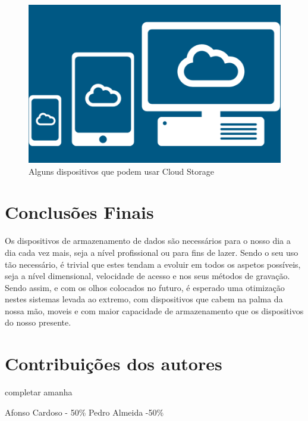 \documentclass{report}
\begin{document}
\vspace{15mm}
 
 	\begin{figure} [h]
		\centering
		\includegraphics[scale=0.5]{cloud-storage2.png}
		\caption{Alguns dispositivos que podem usar Cloud Storage}
	\end{figure}
	

\chapter{Conclusões Finais}
\label{chap.conclusao}

	Os dispositivos de armazenamento de dados são necessários para o nosso dia a dia cada vez mais, seja a nível profissional ou para fins de lazer. Sendo o seu uso tão necessário, é trivial que estes tendam a evoluir em todos os aspetos possíveis, seja a nível dimensional, velocidade de acesso e nos seus métodos de gravação. Sendo assim, e com os olhos colocados no futuro, é esperado uma otimização nestes sistemas levada ao extremo, com dispositivos que cabem na palma da nossa mão, moveis e com maior capacidade de armazenamento que os dispositivos do nosso presente.

 
\chapter*{Contribuições dos autores}
completar amanha

Afonso Cardoso - 50\%
Pedro Almeida -50\%
\end{document}
